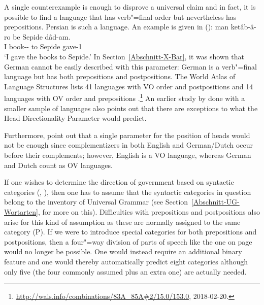 A single counterexample is enough to disprove a universal  claim and in fact, it is possible to
find a language that has verb"=final order but nevertheless has prepositions.
Persian is such a language. An example is given in ():
\ea
\gll man ketâb-â-ro be Sepide dâd-am.\\
     I book-\pl-\RA{} to Sepide gave-1\sg\\
\glt `I gave the books to Sepide.'
\z
In Section~\ref{Abschnitt-X-Bar}, it was shown that German cannot be easily described with this parameter: German is a verb"=final language but has both
prepositions and postpositions. The World Atlas of Language Structures lists 41 languages with VO
order and postpositions and 14 languages with OV order and prepositions \citep{wals-83,wals-85}.\footnote{%
  \url{http://wals.info/combinations/83A_85A\#2/15.0/153.0}, 2018-02-20.
} An earlier study by \citet{Dryer92a} done with a smaller sample of languages also points out that
there are exceptions to what the Head Directionality Parameter would predict. 

Furthermore, \citet[]{GW94a} point out that a single parameter for the position of heads would not be enough since complementizers in both English and German/Dutch
occur before their complements; however, English is a VO language, whereas German and Dutch count as OV languages.

If one wishes to determine the direction of government based on syntactic categories (\citealp[]{GW94a}, \citealp[]{Chomsky2005a}), then one has to assume
that the syntactic categories in question belong to the inventory of Universal Grammar (see Section~\ref{Abschnitt-UG-Wortarten}, for more on this).
Difficulties with prepositions and postpositions also arise for this kind of assumption as these are normally assigned to the same category (P).
If we were to introduce special categories for both prepositions and postpositions, then a four"=way
division of parts of speech like the one on page~\pageref{Tabelle-Merkmalszerlegung-Wortarten} would
no longer be possible. One would instead require an additional binary feature and one would thereby
automatically predict eight categories although only five (the four commonly assumed plus an extra one) are actually needed.

